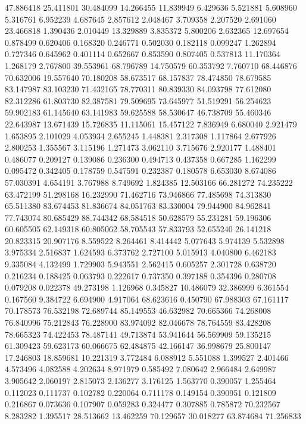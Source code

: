 47.886418
25.411801
30.484099
14.266455
11.839949
6.429636
5.521881
5.608960
5.316761
6.952239
4.687645
2.857612
2.048467
3.709358
2.207520
2.691060
23.466818
1.390436
2.010449
13.329889
3.835372
5.800206
2.632365
12.697654
0.878499
0.620406
0.168320
0.246771
0.502030
0.182118
0.099247
1.262894
0.727346
0.645962
0.401114
0.652667
0.853590
0.807405
0.537813
11.170364
1.268179
2.767800
39.553961
68.796789
14.750579
60.353792
7.760710
68.446876
70.632006
19.557640
70.180208
58.673517
68.157837
78.474850
78.679585
83.147987
83.103230
71.432165
78.770311
80.839330
84.093798
77.612080
82.312286
61.803730
82.387581
79.509695
73.645977
51.519291
56.254623
59.902183
61.145640
63.141983
59.625588
58.530647
46.738709
55.460346
22.643987
13.671439
15.726835
11.115061
15.457122
7.836949
6.680040
2.921479
1.653895
2.101029
4.053934
2.655245
1.448381
2.317308
1.117864
2.677926
2.800253
1.355567
3.115196
1.271473
3.062110
3.715676
2.920177
1.488401
0.486077
0.209127
0.139086
0.236300
0.494713
0.437358
0.667285
1.162299
0.095472
0.342405
0.178759
0.547591
0.232387
0.180578
6.653030
8.674086
57.030391
4.654191
3.767988
8.749692
1.824385
12.503166
66.281272
74.235222
63.472199
51.298168
16.232990
71.462716
73.946866
77.485698
74.313830
65.511380
83.674453
81.836674
84.051763
83.330004
79.944900
84.962841
77.743074
80.685429
88.744342
68.584518
50.628579
55.231281
59.196306
60.605505
62.149318
60.805062
58.705543
57.833793
52.655240
26.141218
20.823315
20.907176
8.559522
8.264461
8.414442
5.077643
5.974139
5.532898
3.975334
2.516837
1.624593
6.373762
2.727100
5.015913
4.040800
6.462183
9.335084
4.132499
1.729903
5.943551
2.562415
0.605257
2.301728
0.638720
0.216234
0.188425
0.063793
0.222617
0.737350
0.397188
0.354396
0.280708
0.079208
0.022378
49.273198
1.126968
0.345827
10.486079
32.386999
6.361554
0.167560
9.384722
6.694900
4.917064
68.623616
0.450790
67.988303
67.161117
70.178573
76.532198
72.689744
85.149553
46.632982
70.665366
74.268008
76.840996
75.212843
76.228900
83.974092
82.046678
78.764559
83.428208
78.665323
74.422453
78.487141
49.713874
53.941644
56.569909
59.135215
61.309423
59.623173
60.066675
62.484875
42.166147
36.998679
25.800147
17.246803
18.859681
10.221319
3.772484
6.088912
5.551088
1.399527
2.401466
4.573496
4.082588
4.202634
8.971979
0.585492
7.080642
2.966484
2.649987
3.905642
2.060197
2.815073
2.136277
3.176125
1.563770
0.390057
1.255464
0.112023
0.111737
0.102782
0.220064
0.711178
0.149154
0.390951
0.121809
0.216867
0.073636
0.107907
0.059283
0.324477
0.307885
0.785872
70.232567
8.283282
1.395517
28.513662
13.462259
70.129657
30.018277
63.874684
71.256833
